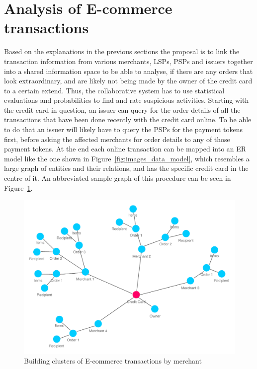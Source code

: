 
\section{Analysis of \gls{E-commerce} transactions}
\label{sec:analyse_transactions}

Based on the explanations in the previous sections the proposal is to link the transaction information from various merchants, \gls{LSP}s, \gls{PSP}s and issuers together into a shared information space to be able to analyse, if there are any orders that look extraordinary, and are likely not being made by the owner of the credit card to a certain extend. Thus, the collaborative system has to use statistical evaluations and probabilities to find and rate suspicious activities. Starting with the credit card in question, an issuer can query for the order details of all the transactions that have been done recently with the credit card online. To be able to do that an issuer will likely have to query the \gls{PSP}s for the payment tokens first, before asking the affected merchants for order details to any of those payment tokens. At the end each online transaction can be mapped into an \gls{ER} model like the one shown in Figure~\ref{fig:images_data_model}, which resembles a large graph of entities and their relations, and has the specific credit card in the centre of it. An abbreviated sample graph of this procedure can be seen in Figure~\ref{fig:images_credit_card_graph}. \@

\begin{figure}[H]
  \centering
  \includegraphics[width=0.8\columnwidth]{images/ontology_scenario_2.pdf}
  \caption{Building clusters of \gls{E-commerce} transactions by merchant}
\label{fig:images_credit_card_graph}
\end{figure}

